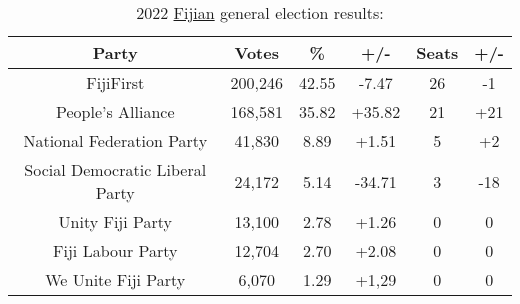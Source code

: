 \begin{table}[htpb]
    \centering
    \caption{2022 \underline{Fijian} general election results:}
    \begin{tabular}{|c|c|c|c|c|c|} \hline 
         Party& Votes& \%& +/-& Seats& +/-\\ \hline
         FijiFirst& 200,246& 42.55& -7.47& 26& -1\\ \hline
         People's Alliance& 168,581& 35.82& +35.82& 21& +21\\ \hline
         National Federation Party& 41,830& 8.89& +1.51& 5& +2\\ \hline
         Social Democratic Liberal Party& 24,172& 5.14& -34.71& 3& -18\\ \hline
         Unity Fiji Party& 13,100& 2.78& +1.26& 0& 0\\ \hline
         Fiji Labour Party& 12,704& 2.70& +2.08& 0& 0\\ \hline
         We Unite Fiji Party& 6,070& 1.29& +1,29& 0& 0\\ \hline
    \end{tabular}
    \label{tab:Fiji}
\end{table}